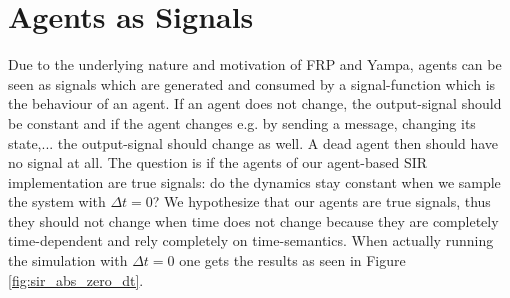 \section{Agents as Signals}
Due to the underlying nature and motivation of FRP and Yampa, agents can be seen as signals which are generated and consumed by a signal-function which is the behaviour of an agent.  If an agent does not change, the output-signal should be constant and if the agent changes e.g. by sending a message, changing its state,... the output-signal should change as well. A dead agent then should have no signal at all.
The question is if the agents of our agent-based SIR implementation are true signals: do the dynamics stay constant when we sample the system with $\Delta t = 0$? We hypothesize that our agents are true signals, thus they should not change when time does not change because they are completely time-dependent and rely completely on time-semantics. When actually running the simulation with $\Delta t = 0$ one gets the results as seen in Figure \ref{fig:sir_abs_zero_dt}.

